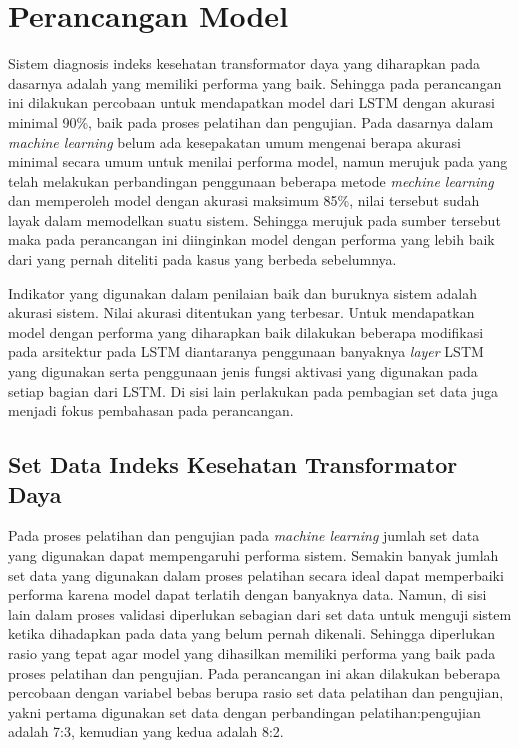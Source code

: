 \section{Perancangan Model}

Sistem diagnosis indeks kesehatan transformator daya yang diharapkan pada dasarnya adalah yang memiliki performa yang baik. Sehingga pada perancangan ini dilakukan percobaan untuk mendapatkan model dari LSTM dengan akurasi minimal 90\%, baik pada proses pelatihan dan pengujian. Pada dasarnya dalam \textit{machine learning} belum ada kesepakatan umum mengenai berapa akurasi minimal secara umum untuk menilai performa model, namun merujuk pada \cite{dwivedi2018performance} yang telah melakukan perbandingan penggunaan beberapa metode \textit{mechine learning} dan memperoleh model dengan akurasi maksimum 85\%, nilai tersebut sudah layak dalam memodelkan suatu sistem. Sehingga merujuk pada sumber tersebut maka pada perancangan ini diinginkan model dengan performa yang lebih baik dari yang pernah diteliti pada kasus yang berbeda sebelumnya.

Indikator yang digunakan dalam penilaian baik dan buruknya sistem adalah akurasi sistem. Nilai akurasi ditentukan yang terbesar. Untuk mendapatkan model dengan performa yang diharapkan baik dilakukan beberapa modifikasi pada arsitektur pada LSTM diantaranya penggunaan banyaknya \textit{layer} LSTM yang digunakan serta penggunaan jenis fungsi aktivasi yang digunakan pada setiap bagian dari LSTM. Di sisi lain perlakukan pada pembagian set data juga menjadi fokus pembahasan pada perancangan.

\subsection{Set Data Indeks Kesehatan Transformator Daya}
Pada proses pelatihan dan pengujian pada \textit{machine learning} jumlah set data yang digunakan dapat mempengaruhi performa sistem. Semakin banyak jumlah set data yang digunakan dalam proses pelatihan secara ideal dapat memperbaiki performa karena model dapat terlatih dengan banyaknya data. Namun, di sisi lain dalam proses validasi diperlukan sebagian dari set data untuk menguji sistem ketika dihadapkan pada data yang belum pernah dikenali. Sehingga diperlukan rasio yang tepat agar model yang dihasilkan memiliki performa yang baik pada proses pelatihan dan pengujian. Pada perancangan ini akan dilakukan beberapa percobaan dengan variabel bebas berupa rasio set data pelatihan dan pengujian, yakni pertama digunakan set data dengan perbandingan pelatihan:pengujian adalah 7:3, kemudian yang kedua adalah 8:2. 

